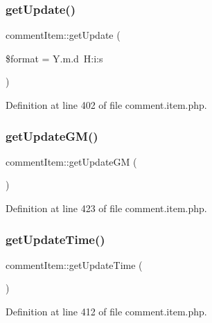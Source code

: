 \subsubsection{\texorpdfstring{get\+Update()}{getUpdate()}}
{\footnotesize\ttfamily comment\+Item\+::get\+Update (\begin{DoxyParamCaption}\item[{}]{\$format = {\ttfamily \textquotesingle{}Y.m.d~H\+:i\+:s\textquotesingle{}} }\end{DoxyParamCaption})}



Definition at line 402 of file comment.\+item.\+php.

\mbox{\label{classcommentItem_aab0135e2edd37a47cc390da9b4c79dfa}} 
\subsubsection{\texorpdfstring{get\+Update\+G\+M()}{getUpdateGM()}}
{\footnotesize\ttfamily comment\+Item\+::get\+Update\+GM (\begin{DoxyParamCaption}{ }\end{DoxyParamCaption})}



Definition at line 423 of file comment.\+item.\+php.

\mbox{\label{classcommentItem_a59d0264c1b6842c6a0dfa21a6dfe1edb}} 
\subsubsection{\texorpdfstring{get\+Update\+Time()}{getUpdateTime()}}
{\footnotesize\ttfamily comment\+Item\+::get\+Update\+Time (\begin{DoxyParamCaption}{ }\end{DoxyParamCaption})}



Definition at line 412 of file comment.\+item.\+php.

\mbox{\label{classcommentItem_aaa9c1ef5cfd0ce69fd83d8d980360ee5}} 
